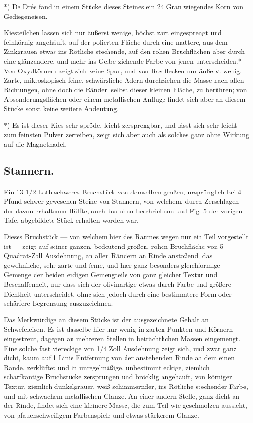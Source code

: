 \documentclass[a4paper, 11pt, oneside, german]{article}
\begin{document}
*) De Drée fand in einem Stücke dieses Steines ein 24 Gran wiegendes Korn von Gediegeneisen.

Kiesteilchen lassen sich nur äußerst wenige, höchst zart eingesprengt und feinkörnig angehäuft, auf der polierten Fläche durch eine mattere, aus dem Zinkgrauen etwas ins Rötliche stechende, auf den rohen Bruchflächen aber durch eine glänzendere, und mehr ins Gelbe ziehende Farbe von jenen unterscheiden.* Von Oxydkörnern zeigt sich keine Spur, und von Rostflecken nur äußerst wenig. Zarte, mikroskopisch feine, schwärzliche Adern durchziehen die Masse nach allen Richtungen, ohne doch die Ränder, selbst dieser kleinen Fläche, zu berühren; von Absonderungsflächen oder einem metallischen Anfluge findet sich aber an diesem Stücke sonst keine weitere Andeutung.

*) Es ist dieser Kies sehr spröde, leicht zersprengbar, und lässt sich sehr leicht zum feinsten Pulver zerreiben, zeigt sich aber auch als solches ganz ohne Wirkung auf die Magnetnadel.

\subsection{Stannern.}
\paragraph{}
Ein 13 1/2 Loth schweres Bruchstück von demselben großen, ursprünglich bei 4 Pfund schwer gewesenen Steine von Stannern, von welchem, durch Zerschlagen der davon erhaltenen Hälfte, auch das oben beschriebene und Fig. 5 der vorigen Tafel abgebildete Stück erhalten worden war.

Dieses Bruchstück --- von welchem hier des Raumes wegen nur ein Teil vorgestellt ist --- zeigt auf seiner ganzen, bedeutend großen, rohen Bruchfläche von 5 Quadrat-Zoll Ausdehnung, an allen Rändern an Rinde anstoßend, das gewöhnliche, sehr zarte und feine, und hier ganz besonders gleichförmige Gemenge der beiden erdigen Gemengteile von ganz gleicher Textur und Beschaffenheit, nur dass sich der olivinartige etwas durch Farbe und größere Dichtheit unterscheidet, ohne sich jedoch durch eine bestimmtere Form oder schärfere Begrenzung auszuzeichnen.

Das Merkwürdige an diesem Stücke ist der ausgezeichnete Gehalt an Schwefeleisen. Es ist dasselbe hier nur wenig in zarten Punkten und Körnern eingestreut, dagegen an mehreren Stellen in beträchtlichen Massen eingemengt. Eine solche fast viereckige von 1/4 Zoll Ausdehnung zeigt sich, und zwar ganz dicht, kaum auf 1 Linie Entfernung von der anstehenden Rinde an dem einen Rande, zerklüftet und in unregelmäßige, unbestimmt eckige, ziemlich scharfkantige Bruchstücke zersprungen und bröcklig angehäuft, von körniger Textur, ziemlich dunkelgrauer, weiß schimmernder, ins Rötliche stechender Farbe, und mit schwachem metallischen Glanze. An einer andern Stelle, ganz dicht an der Rinde, findet sich eine kleinere Masse, die zum Teil wie geschmolzen aussieht, von pfauenschweifigem Farbenspiele und etwas stärkerem Glanze.
\end{document}
